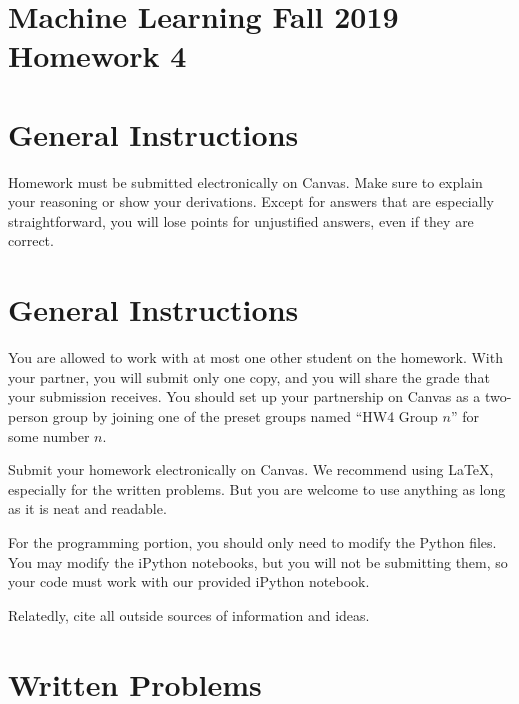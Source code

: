 \documentclass[10pt]{article}
\begin{document}
\section*{Machine Learning Fall 2019 Homework 4}

\section*{General Instructions}

Homework must be submitted electronically on Canvas. Make sure to explain your reasoning or show your derivations. Except for answers that are especially straightforward, you will lose points for unjustified answers, even if they are correct. 

\section*{General Instructions}

You are allowed to work with at most one other student on the homework. With your partner, you will submit only one copy, and you will share the grade that your submission receives. You should set up your partnership on Canvas as a two-person group by joining one of the preset groups named ``HW4 Group $n$'' for some number $n$.

Submit your homework electronically on Canvas. We recommend using LaTeX, especially for the written problems. But you are welcome to use anything as long as it is neat and readable. 

For the programming portion, you should only need to modify the Python files. You may modify the iPython notebooks, but you will not be submitting them, so your code must work with our provided iPython notebook.

Relatedly, cite all outside sources of information and ideas. 

\section*{Written Problems}
\end{document}
